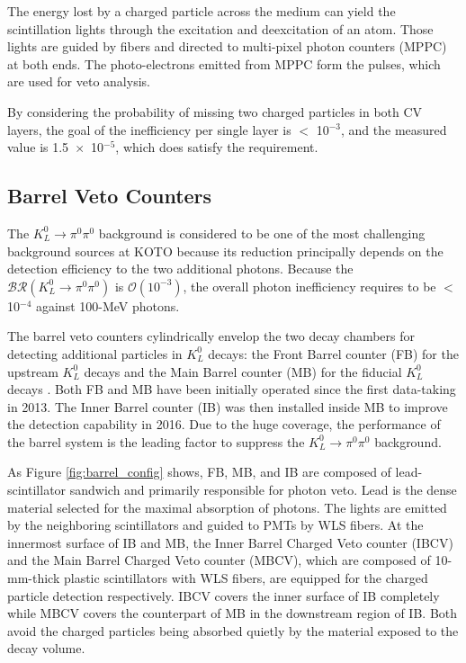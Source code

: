 The energy lost by a charged particle across the medium can yield the scintillation lights through the excitation and deexcitation of an atom. Those lights are guided by fibers and directed to multi-pixel photon counters (MPPC) at both ends. The photo-electrons emitted from MPPC form the pulses, which are used for veto analysis.

By considering the probability of missing two charged particles in both CV layers, the goal of the inefficiency per single layer is $<$ 10$^{-3}$, and the measured value is 1.5~$\times$~10$^{-5}$, which does satisfy the requirement.




\subsection{Barrel Veto Counters}
The ${K_L^0\to\pi^0\pi^0}$ background is considered to be one of the most challenging background sources at KOTO because its reduction principally depends on the detection efficiency to the two additional photons. Because the ${\mathcal{BR}(K_L^0\to\pi^0\pi^0)}$ is $\mathcal{O}(10^{-3})$, the overall photon inefficiency requires to be $<$ 10$^{-4}$ against 100-MeV photons.

The barrel veto counters cylindrically envelop the two decay chambers for detecting additional particles in $K_L^0$ decays: the Front Barrel counter (FB) for the upstream $K_L^0$ decays and the Main Barrel counter (MB) for the fiducial $K_L^0$ decays \parencite{barrel_veto}. Both FB and MB have been initially operated since the first data-taking in 2013. The Inner Barrel counter (IB)  \parencite{IB} was then installed inside MB to improve the detection capability in 2016. Due to the huge coverage, the performance of the barrel system is the leading factor to suppress the ${K_L^0\to\pi^0\pi^0}$ background.

As Figure \ref{fig:barrel_config} shows, FB, MB, and IB are composed of lead-scintillator sandwich and primarily responsible for photon veto. Lead is the dense material selected for the maximal absorption of photons. The lights are emitted by the neighboring scintillators and guided to PMTs by WLS fibers. At the innermost surface of IB and MB, the Inner Barrel Charged Veto counter (IBCV) and the Main Barrel Charged Veto counter (MBCV), which are composed of 10-mm-thick plastic scintillators with WLS fibers, are equipped for the charged particle detection respectively. IBCV covers the inner surface of IB completely while MBCV covers the counterpart of MB in the downstream region of IB. Both avoid the charged particles being absorbed quietly by the material exposed to the decay volume. 

